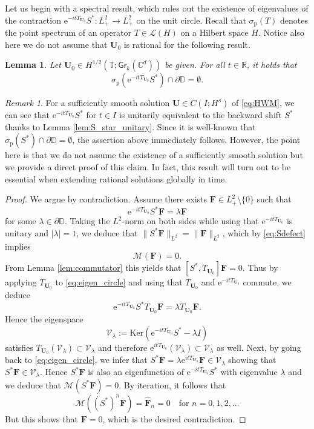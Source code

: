 \documentclass[10pt,reqno,a4paper]{amsart}
\newtheorem{lem}{Lemma}[section]
\theoremstyle{definition}
\theoremstyle{remark}
\theoremstyle{remark}
\newtheorem*{remark*}{Remark}
\numberwithin{equation}{section}
\newcommand{\C}{\mathbb{C}}
\newcommand{\R}{\mathbb{R}}
\newcommand{\T}{\mathbb{T}}
\newcommand{\D}{\mathbb{D}}
\newcommand{\Mean}{\mathscr{M}}
\renewcommand{\ker}{\mathrm{Ker}}
\newcommand{\pt}{\partial}
\renewcommand{\sp}{\sigma_{\mathrm{p}}}
\newcommand{\be}{\begin{equation}}
\newcommand{\ee}{\end{equation}}
\newcommand{\eu}{\mathrm{e}}
\newcommand{\Ub}{\mathbf{U}}
\newcommand{\Fb}{\mathbf{F}}
\newcommand{\id}{I}
\newcommand{\Gr}{\mathsf{Gr}}
\newcommand{\Ls}{\mathscr{L}}
\newcommand{\Vs}{\mathscr{V}}
\begin{document}
Let us begin with a spectral result, which rules out the existence of eigenvalues of the contraction $\eu^{-it T_{\Ub_0}} S^* : L^2_+ \to L^2_+$ on the unit circle. Recall that $\sp(T)$ denotes the point spectrum of an operator $T \in \Ls(H)$ on a Hilbert space $H$. Notice also here we do not assume that $\Ub_0$ is rational for the following result.

\begin{lem} \label{lem:sigma_p}
Let $\Ub_0 \in H^{1/2}(\T; \Gr_k(\C^d))$ be given. For all $t \in \R$, it holds that
$$
\sp ( \eu^{-i t T_{\Ub_0}} S^*) \cap \pt \D = \emptyset.
$$
\end{lem}

\begin{remark*}
For a sufficiently smooth solution $\Ub \in C(I; H^s)$ of \eqref{eq:HWM}, we can see that $\eu^{-it T_{\Ub_0}} S^*$ for $t \in I$ is unitarily equivalent to the backward shift $S^*$ thanks to Lemma \ref{lem:S_star_unitary}. Since it is well-known that $\sp(S^*) \cap \pt \D = \emptyset$, the assertion above immediately follows. However, the point here is that we do not assume the existence of a sufficiently smooth solution but we provide a direct proof of this claim. In fact, this result will turn out to be essential when extending rational solutions globally in time.
 \end{remark*}

\begin{proof}
We argue by contradiction. Assume there exists $\Fb \in L^2_+ \setminus \{ 0 \}$ such that
\be \label{eq:eigen_circle}
\eu^{-it T_{\Ub_0}} S^* \Fb = \lambda \Fb
\ee
for some $\lambda \in \pt \D$. Taking the $L^2$-norm on both sides while using that $\eu^{-it T_{\Ub_0}}$ is unitary and $|\lambda|=1$, we deduce that $\|S^* \Fb\|_{L^2} = \| \Fb \|_{L^2}$, which by \eqref{eq:Sdefect} implies
$$
\Mean(\Fb) = 0.
$$
From Lemma \ref{lem:commutator} this yields that $[S^*,T_{\Ub_0}] \Fb = 0$. Thus by applying $T_{\Ub_0}$ to \eqref{eq:eigen_circle} and using that $T_{\Ub_0}$ and $\eu^{-it T_{\Ub_0}}$ commute, we deduce 
$$
\eu^{-it T_{\Ub_0}} S^* T_{\Ub_0} \Fb = \lambda T_{\Ub_0} \Fb.
$$
Hence the eigenspace
$$
\Vs_\lambda := \ker ( \eu^{-it T_{\Ub_0}} S^* - \lambda \id) 
$$
satisfies $T_{\Ub_0}(\Vs_\lambda) \subset \Vs_\lambda$ and therefore $\eu^{it T_{\Ub_0}}(\Vs_\lambda) \subset \Vs_\lambda$ as well. Next, by going back to \eqref{eq:eigen_circle}, we infer that $S^* \Fb = \lambda \eu^{it T_{\Ub_0}} \Fb \in \Vs_\lambda$ showing that
$S^* \Fb \in \Vs_\lambda$. Hence $S^* \Fb$ is also an eigenfunction of $\eu^{-it T_{\Ub_0}} S^*$ with eigenvalue $\lambda$ and we deduce that $\Mean(S^* \Fb)=0$. By iteration, it follows that
$$
\Mean((S^*)^n \Fb) = \widehat{\Fb}_n = 0 \quad \mbox{for $n=0,1,2,\ldots$}
$$
But this shows that $\Fb=0$, which is the desired contradiction.
\end{proof}
\end{document}

